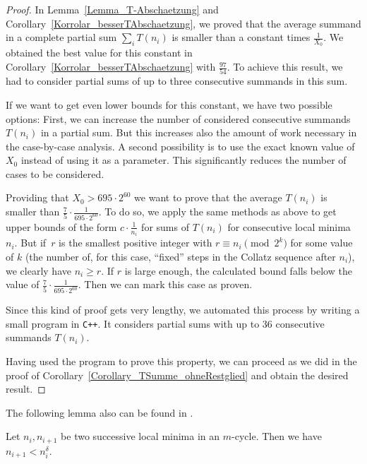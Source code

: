 \documentclass[12pt,reqno]{article}
\begin{document}
\begin{proof}
In Lemma~\ref{Lemma_T-Abschaetzung} and Corollary~\ref{Korrolar_besserTAbschaetzung}, we proved that the average summand in a complete partial sum $\sum_i T(n_i)$ is smaller than a constant times $\frac{1}{X_0}$. We obtained the best value for this constant in Corollary~\ref{Korrolar_besserTAbschaetzung} with $\frac{97}{54}$. To achieve this result, we had to consider partial sums of up to three consecutive summands in this sum.

If we want to get even lower bounds for this constant, we have two possible options: First, we can increase the number of considered consecutive summands $T(n_i)$ in a partial sum. But this increases also the amount of work necessary in the case-by-case analysis. A second possibility is to use the exact known value of $X_0$ instead of using it as a parameter. This significantly reduces the number of cases to be considered.

Providing that $X_0>695\cdot 2^{60}$ we want to prove that the average $T(n_i)$ is smaller than $\frac{7}{5} \cdot \frac{1}{695\cdot 2^{60}}$. To do so, we apply the same methods as above to get upper bounds of the form $c \cdot \tfrac{1}{n_i}$ for sums of $T(n_i)$ for consecutive local minima $n_i$. But if~$r$ is the smallest positive integer with $r\equiv n_i \pmod{2^k}$ for some value of $k$ (the number of, for this case, ``fixed'' steps in the Collatz sequence after $n_i$), we clearly have $n_i\geq r$. If $r$ is large enough, the calculated bound falls below the value of $\tfrac{7}{5} \cdot \tfrac{1}{695\cdot 2^{60}}$. Then we can mark this case as proven.

Since this kind of proof gets very lengthy, we automated this process
by writing a small program in {\tt C++}. It considers partial sums with up to
36 consecutive summands $T(n_i)$.

Having used the program to prove this property, we can proceed as we did in the proof of Corollary~\ref{Corollary_TSumme_ohneRestglied} and obtain the desired result.
\end{proof}

The following lemma also can be found in \cite{SW-www}.

\begin{lemma}\label{Lemma14}
Let $n_i, n_{i+1}$ be two successive local minima in an $m$-cycle. Then we have $n_{i+1} < n_i^{\delta}$.
\end{lemma}
\end{document}
